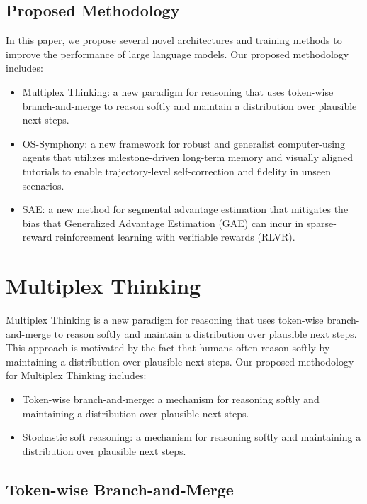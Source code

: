 \documentclass{article}
\begin{document}
\subsection{Proposed Methodology}

In this paper, we propose several novel architectures and training methods to improve the performance of large language models. Our proposed methodology includes:

\begin{itemize}
\item Multiplex Thinking: a new paradigm for reasoning that uses token-wise branch-and-merge to reason softly and maintain a distribution over plausible next steps.
\item OS-Symphony: a new framework for robust and generalist computer-using agents that utilizes milestone-driven long-term memory and visually aligned tutorials to enable trajectory-level self-correction and fidelity in unseen scenarios.
\item SAE: a new method for segmental advantage estimation that mitigates the bias that Generalized Advantage Estimation (GAE) can incur in sparse-reward reinforcement learning with verifiable rewards (RLVR).
\end{itemize}

\section{Multiplex Thinking}

Multiplex Thinking is a new paradigm for reasoning that uses token-wise branch-and-merge to reason softly and maintain a distribution over plausible next steps. This approach is motivated by the fact that humans often reason softly by maintaining a distribution over plausible next steps. Our proposed methodology for Multiplex Thinking includes:

\begin{itemize}
\item Token-wise branch-and-merge: a mechanism for reasoning softly and maintaining a distribution over plausible next steps.
\item Stochastic soft reasoning: a mechanism for reasoning softly and maintaining a distribution over plausible next steps.
\end{itemize}

\subsection{Token-wise Branch-and-Merge}
\end{document}
